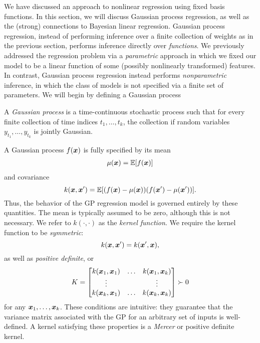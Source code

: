 
We have discussed an approach to nonlinear regression using fixed basis functions. In this section, we will discuss Gaussian process regression, as well as the (strong) connections to Bayesian linear regression. Gaussian process regression, instead of performing inference over a finite collection of weights as in the previous section, performs inference directly over \textit{functions}. We previously addressed the regression problem via a \textit{parametric} approach in which  we fixed our model to be a linear function of some (possibly nonlinearly transformed) features. In contrast, Gaussian process regression instead performs \textit{nonparametric} inference, in which the class of models is not specified via a finite set of parameters. We will begin by defining a Gaussian process
\begin{definition}
A \textit{Gaussian process} is a time-continuous stochastic process such that for every finite collection of time indices $t_1, \ldots, t_k$, the collection if random variables $y_{t_1}, \ldots, y_{t_k}$ is jointly Gaussian. 
\end{definition}

A Gaussian process $f(\bm{x})$ is fully specified by its mean
\begin{align}
    \mu(\bm{x}) = \mathbb{E}[f(\bm{x})]
\end{align}
and covariance 
\begin{equation}
    k(\bm{x},\bm{x}') = \mathbb{E}[(f(\bm{x}) - \mu(\bm{x}))(f(\bm{x}') - \mu(\bm{x}'))].
\end{equation}
Thus, the behavior of the GP regression model is governed entirely by these quantities. The mean is typically assumed to be zero, although this is not necessary. We refer to $k(\cdot, \cdot)$ as the \textit{kernel function}. We require the kernel function to be \textit{symmetric}: 
\begin{equation}
    k(\bm{x}, \bm{x}') = k(\bm{x}', \bm{x}),
\end{equation} 
as well as \textit{positive definite}, or 
\begin{equation}
    K = \begin{bmatrix}
    k(\bm{x}_1, \bm{x}_1) & \ldots & k(\bm{x}_1, \bm{x}_k)\\
    \vdots & & \vdots\\
    k(\bm{x}_k, \bm{x}_1) & \ldots & k(\bm{x}_k, \bm{x}_k)
    \end{bmatrix} \succ 0
\end{equation}
for any $\bm{x}_1, \ldots, \bm{x}_k$. These conditions are intuitive: they guarantee that the variance matrix associated with the GP for an arbitrary set of inputs is well-defined. A kernel satisfying these properties is a \textit{Mercer} or positive definite kernel. 

